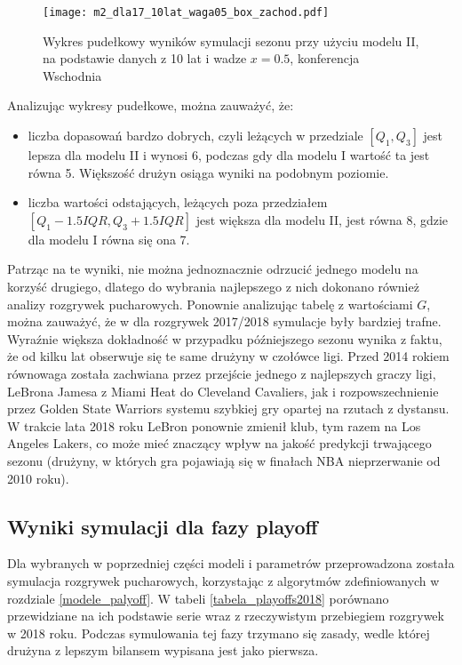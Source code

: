 \documentclass[inzynierska]{pwr_wmat_praca_dyplomowa}
\theoremstyle{plain}
\numberwithin{theorem}{chapter}
\theoremstyle{definition}
\numberwithin{theorem}{chapter}
\begin{document}
\begin{figure}[t]
	\hspace*{-3cm}  
	\texttt{[image: m2\_dla17\_10lat\_waga05\_box\_zachod.pdf]}
	\caption{Wykres pudełkowy wyników symulacji sezonu przy użyciu modelu II, na podstawie danych z 10 lat i wadze $x=0.5$, konferencja Wschodnia}
	\label{m2_10lat_waga05_zachod_17}
	\centering
\end{figure}
Analizując wykresy pudełkowe, można zauważyć, że:
\begin{itemize}
	\item liczba dopasowań bardzo dobrych, czyli leżących w przedziale $[Q_1,Q_3]$ jest lepsza dla modelu II i wynosi 6, podczas gdy dla modelu I wartość ta jest równa 5. Większość drużyn osiąga wyniki na podobnym poziomie.
	\item liczba wartości odstających, leżących poza przedziałem $[Q_1-1.5IQR,Q_3+1.5IQR]$ jest większa dla modelu II, jest równa 8, gdzie dla modelu I równa się ona 7.
\end{itemize}
Patrząc na te wyniki, nie można jednoznacznie odrzucić jednego modelu na korzyść drugiego, dlatego do wybrania najlepszego z nich dokonano również analizy rozgrywek pucharowych. Ponownie analizując tabelę z wartościami $G$, można zauważyć, że w dla rozgrywek 2017/2018 symulacje były bardziej trafne. Wyraźnie większa dokładność w przypadku późniejszego sezonu wynika z faktu, że od kilku lat obserwuje się te same drużyny w czołówce ligi. Przed 2014 rokiem równowaga została zachwiana przez przejście jednego z najlepszych graczy ligi, LeBrona Jamesa z Miami Heat do Cleveland Cavaliers, jak i rozpowszechnienie przez Golden State Warriors systemu szybkiej gry opartej na rzutach z dystansu. W trakcie lata 2018 roku LeBron ponownie zmienił klub, tym razem na Los Angeles Lakers, co może mieć znaczący wpływ na jakość predykcji trwającego sezonu (drużyny, w których gra pojawiają się w finałach NBA nieprzerwanie od 2010 roku). 

\subsection{Wyniki symulacji dla fazy playoff}
Dla wybranych w poprzedniej części modeli i parametrów przeprowadzona została symulacja rozgrywek pucharowych, korzystając z algorytmów zdefiniowanych w rozdziale \ref{modele_palyoff}. W tabeli \ref{tabela_playoffs2018} porównano przewidziane na ich podstawie serie wraz z rzeczywistym przebiegiem rozgrywek w 2018 roku. Podczas symulowania tej fazy trzymano się zasady, wedle której drużyna z lepszym bilansem wypisana jest jako pierwsza. 
\end{document}
